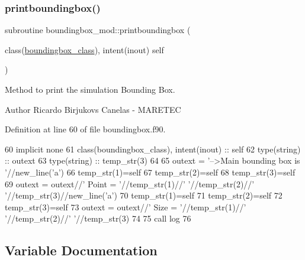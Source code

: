 \subsubsection{\texorpdfstring{printboundingbox()}{printboundingbox()}}
{\footnotesize\ttfamily subroutine boundingbox\+\_\+mod\+::printboundingbox (\begin{DoxyParamCaption}\item[{class(\mbox{\hyperlink{structboundingbox__mod_1_1boundingbox__class}{boundingbox\+\_\+class}}), intent(inout)}]{self }\end{DoxyParamCaption})\hspace{0.3cm}{\ttfamily [private]}}



Method to print the simulation Bounding Box. 

\begin{DoxyAuthor}{Author}
Ricardo Birjukovs Canelas -\/ M\+A\+R\+E\+T\+EC 
\end{DoxyAuthor}


Definition at line 60 of file boundingbox.\+f90.


\begin{DoxyCode}
60     \textcolor{keywordtype}{implicit none}
61     \textcolor{keywordtype}{class}(boundingbox\_class), \textcolor{keywordtype}{intent(inout)} :: self
62     \textcolor{keywordtype}{type}(string) :: outext
63     \textcolor{keywordtype}{type}(string) :: temp\_str(3)
64 
65     outext = \textcolor{stringliteral}{'-->Main bounding box is '}//new\_line(\textcolor{stringliteral}{'a'})
66     temp\_str(1)=self%
67     temp\_str(2)=self%
68     temp\_str(3)=self%
69     outext = outext//\textcolor{stringliteral}{'       Point = '}//temp\_str(1)//\textcolor{stringliteral}{' '}//temp\_str(2)//\textcolor{stringliteral}{' '}//temp\_str(3)//new\_line(\textcolor{stringliteral}{'a'})
70     temp\_str(1)=self%
71     temp\_str(2)=self%
72     temp\_str(3)=self%
73     outext = outext//\textcolor{stringliteral}{'       Size = '}//temp\_str(1)//\textcolor{stringliteral}{' '}//temp\_str(2)//\textcolor{stringliteral}{' '}//temp\_str(3)
74     
75     \textcolor{keyword}{call }log%
76 
\end{DoxyCode}


\subsection{Variable Documentation}
\mbox{\label{namespaceboundingbox__mod_a45e98e492bb546328c98f618a74622ec}} 
